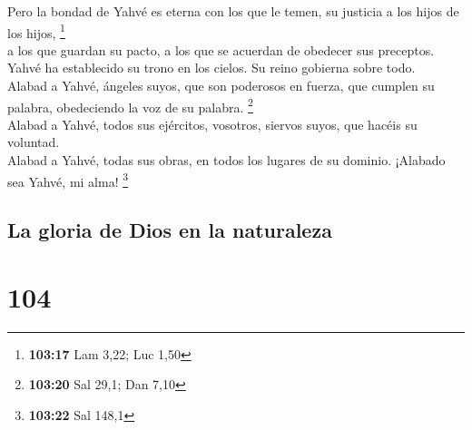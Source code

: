  Pero la bondad de Yahvé es eterna con los que le temen,
su justicia a los hijos de los hijos, \footnote{\textbf{103:17} Lam
  3,22; Luc 1,50}\\
 a los que guardan su pacto, a los que se acuerdan de
obedecer sus preceptos.\\
 Yahvé ha establecido su trono en los cielos. Su reino
gobierna sobre todo.\\
 Alabad a Yahvé, ángeles suyos, que son poderosos en
fuerza, que cumplen su palabra, obedeciendo la voz de su palabra.
\footnote{\textbf{103:20} Sal 29,1; Dan 7,10}\\
 Alabad a Yahvé, todos sus ejércitos, vosotros, siervos
suyos, que hacéis su voluntad.\\
 Alabad a Yahvé, todas sus obras, en todos los lugares de
su dominio. ¡Alabado sea Yahvé, mi alma! \footnote{\textbf{103:22} Sal
  148,1}

\hypertarget{la-gloria-de-dios-en-la-naturaleza}{%
\subsection{La gloria de Dios en la
naturaleza}\label{la-gloria-de-dios-en-la-naturaleza}}

\hypertarget{section-101}{%
\section{104}\label{section-101}}

